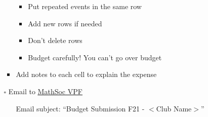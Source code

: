 \documentclass[utf8]{article}
\makeatletter
\newcommand{\termandyear}{F21 }
\newcommand{\MathSocVPF}{\href{mailto:vpf@mathsoc.uwaterloo.ca}{\underline{MathSoc VPF} }}
\makeatother
\begin{document}
\begin{itemize}
\begin{itemize}
\begin{itemize}
\begin{itemize}
                \item Put repeated events in the same row
                \item Add new rows if needed
                \item Don't delete rows
                \item Budget carefully! You can’t go over budget
            \end{itemize}
            \item Add notes to each cell to explain the expense
        \end{itemize}
        \item[$\square$] Email to \MathSocVPF  
            \begin{itemize}
                \item[\textperiodcentered] Email subject: ``Budget Submission \termandyear - $<$Club Name$>$''
            \end{itemize}
                

\end{itemize}
\end{itemize}
\end{document}
